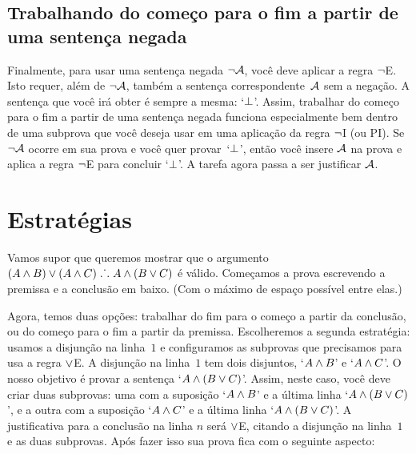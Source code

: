 \subsection*{ Trabalhando do começo para o fim a partir de uma sentença negada}

Finalmente, para usar uma sentença negada $\neg \mathcal{A}$, você deve aplicar a regra $\neg$E. Isto requer, além de  $\neg \mathcal{A}$,  também a sentença correspondente~$\mathcal{A}$ sem a negação. A sentença que você irá obter é sempre a mesma: `$\bot$'. Assim, trabalhar do começo para o fim a partir de uma sentença negada funciona especialmente bem dentro de uma subprova que você deseja usar em uma aplicação da regra $\neg$I (ou PI).  Se $\neg \mathcal{A}$ ocorre em sua prova e você quer provar~`$\bot$', então você insere $\mathcal{A}$ na prova e aplica a regra $\neg$E para concluir `$\bot$'. A tarefa agora passa a ser justificar $\mathcal{A}$.

\begin{fitchproof}
	\ellipsesline 
\end{fitchproof}


\section{Estratégias }

Vamos supor que queremos mostrar que o argumento $(A \wedge B) \vee (A \wedge C) \mathrel{\ldotp\dot{}\,\ldotp} A \wedge (B \vee C)$ é válido. Começamos a prova escrevendo a premissa e a conclusão em baixo. (Com o máximo de espaço possível entre elas.) 
\begin{fitchproof}
\ellipsesline
\end{fitchproof}
Agora, temos duas opções: trabalhar do fim para o começo a partir da conclusão, ou do começo para o fim a partir da premissa. Escolheremos a segunda estratégia: usamos a disjunção na linha~$1$ e configuramos as subprovas que precisamos para usa a regra $\vee$E. A disjunção na linha~$1$ tem dois disjuntos, `$A \wedge B$' e `$A \wedge C$'.  O nosso objetivo é provar a sentença `$A \wedge (B \vee C)$'. Assim, neste caso, você  deve criar duas subprovas:  uma com a suposição `$A \wedge B$' e a última linha `$A \wedge (B \vee C)$', e a  outra com a suposição `$A \wedge C$' e a última linha `$A \wedge (B \vee C)$'. A justificativa para a conclusão na linha $n$  será  $\vee$E,  citando a disjunção na linha~$1$ e as duas subprovas. Após fazer isso sua prova fica com o seguinte aspecto:
 

